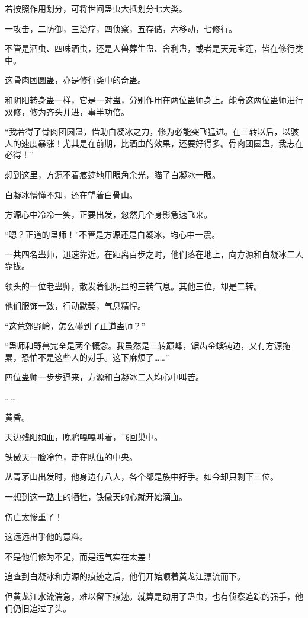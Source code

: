 \begin{this_body}
若按照作用划分，可将世间蛊虫大抵划分七大类。

一攻击，二防御，三治疗，四侦察，五存储，六移动，七修行。

不管是酒虫、四味酒虫，还是人兽葬生蛊、舍利蛊，或者是天元宝莲，皆在修行类中。

这骨肉团圆蛊，亦是修行类中的奇蛊。

和阴阳转身蛊一样，它是一对蛊，分别作用在两位蛊师身上。能令这两位蛊师进行双修，修为齐头并进，事半功倍。

“我若得了骨肉团圆蛊，借助白凝冰之力，修为必能突飞猛进。在三转以后，以骇人的速度暴涨！尤其是在前期，比酒虫的效果，还要好得多。骨肉团圆蛊，我志在必得！”

想到这里，方源不着痕迹地用眼角余光，瞄了白凝冰一眼。

白凝冰懵懂不知，还在望着白骨山。

方源心中冷冷一笑，正要出发，忽然几个身影急速飞来。

“嗯？正道的蛊师！”不管是方源还是白凝冰，均心中一震。

一共四名蛊师，迅速靠近。在距离百步之时，他们落在地上，向方源和白凝冰二人靠拢。

领头的一位老蛊师，散发着很明显的三转气息。其他三位，却是二转。

他们服饰一致，行动默契，气息精悍。

“这荒郊野岭，怎么碰到了正道蛊师？”

“蛊师和野兽完全是两个概念。我虽然是三转巅峰，锯齿金蜈钝边，又有方源拖累，恐怕不是这些人的对手。这下麻烦了……”

四位蛊师一步步逼来，方源和白凝冰二人均心中叫苦。

……

黄昏。

天边残阳如血，晚鸦嘎嘎叫着，飞回巢中。

铁傲天一脸冷色，走在队伍的中央。

从青茅山出发时，他身边有八人，各个都是族中好手。如今却只剩下三位。

一想到这一路上的牺牲，铁傲天的心就开始滴血。

伤亡太惨重了！

这远远出乎他的意料。

不是他们修为不足，而是运气实在太差！

追查到白凝冰和方源的痕迹之后，他们开始顺着黄龙江漂流而下。

但黄龙江水流湍急，难以留下痕迹。就算是动用了蛊虫，也有侦察追踪的强手，他们仍旧追过了头。


\end{this_body}
